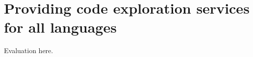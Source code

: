 
\chapter{Providing code exploration services for all languages}
\label{chap:providing-cvs}

Evaluation here.

